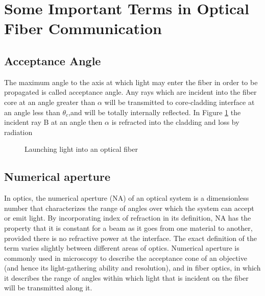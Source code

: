 \documentclass[12pt]{report}
\begin{document}
	\section{Some Important Terms in Optical Fiber Communication }
	\subsection{ Acceptance Angle}
	The maximum angle to the axis at which light may enter the fiber in order to be propagated is called acceptance angle. 
	Any rays which are incident into the fiber core at an angle greater than $\alpha$ will be transmitted to core-cladding interface at an angle less than $\theta_c$,and will be totally internally reflected. 
	In Figure \ref{fig:of_propagation} the incident ray B at an angle then $\alpha$ is refracted into the cladding and loss by radiation
	\begin{figure}[htbp]
		\caption{Launching light into an optical fiber}
		\label{fig:of_propagation}
	\end{figure}
	
	\subsection{Numerical aperture }
	In optics, the numerical aperture (NA) of an optical system is a dimensionless number that characterizes the range of angles over which the system can accept or emit light. By incorporating index of refraction in its definition, NA has the property that it is constant for a beam as it goes from one material to another, provided there is no refractive power at the interface. The exact definition of the term varies slightly between different areas of optics. Numerical aperture is commonly used in microscopy to describe the acceptance cone of an objective (and hence its light-gathering ability and resolution), and in fiber optics, in which it describes the range of angles within which light that is incident on the fiber will be transmitted along it. 
	
\end{document}
